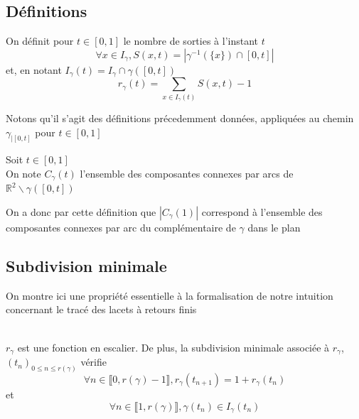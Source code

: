 \documentclass{article}
\begin{document}
\begin{flushleft}
\subsection{Définitions}

\begin{tcolorbox}[colback = yellow!60!white, colframe = orange!90!white, title = Définition 4]
    On définit pour $t \in [0, 1]$ le nombre de sorties à l'instant $t$
    \[\forall x \in I_{\gamma}, S(x, t) = |\gamma^{-1}(\{x\}) \cap [0, t]|\]
    et, en notant $I_{\gamma}(t) = I_{\gamma} \cap \gamma([0, t])$
    \[r_{\gamma}(t) = \sum_{x \in I_{\gamma}(t)} S(x ,t) - 1\]
\end{tcolorbox}
\vspace{0.5cm}
Notons qu'il s'agit des définitions précedemment données, appliquées au chemin $\gamma_{\mid[0, t]}$ pour $t \in [0, 1]$
\vspace{0.5cm}
\begin{tcolorbox}[colback = yellow!60!white, colframe = orange!90!white, title = Définition 5]
    Soit $t \in [0, 1]$\\
    On note $C_{\gamma}(t)$ l'ensemble des composantes connexes par arcs de
    $\mathbb{R}^2 \backslash \gamma([0, t])$
\end{tcolorbox}

\vspace{0.5cm}
On a donc par cette définition que $|C_{\gamma}(1)|$ correspond à l'ensemble des composantes connexes par arc du
complémentaire de $\gamma$ dans le plan

\subsection{Subdivision minimale}

On montre ici une propriété essentielle à la formalisation de notre intuition concernant le tracé des lacets à retours finis
\\~\\
\begin{tcolorbox}[colback=purple!20!white, colframe=purple!60!white, title = Proposition 9]
    $r_{\gamma}$ est une fonction en escalier. De plus, la subdivision minimale
    associée à $r_{\gamma}$, $(t_n)_{0 \leq n \leq r(\gamma)}$ vérifie
    \[\forall n \in \llbracket 0, r(\gamma) -1 \rrbracket, r_{\gamma}(t_{n+1}) = 1 + r_{\gamma}(t_n)\]
    et
    \[ \forall n \in \llbracket 1, r(\gamma) \rrbracket, \gamma(t_n) \in I_{\gamma}(t_n) \]
\end{tcolorbox}
\vspace{0.5cm}


\end{flushleft}
\end{document}
